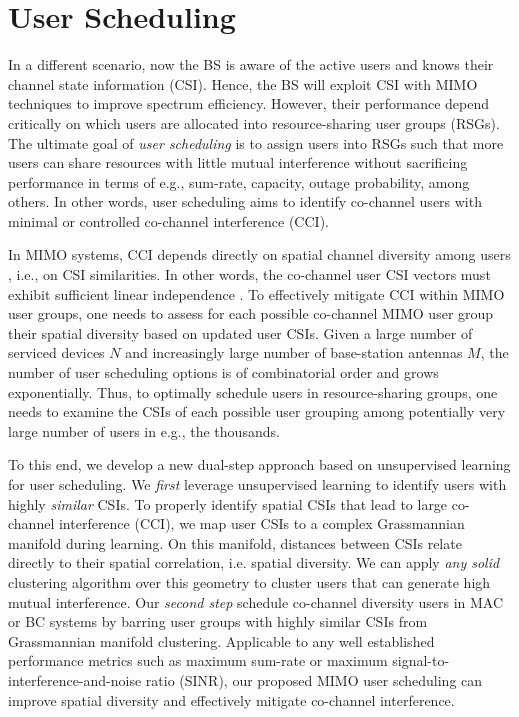\section{User Scheduling}

In a different scenario, now the BS is aware of the active users and knows their channel state information (CSI). Hence, the BS will exploit CSI with MIMO techniques to improve spectrum efficiency.
However, their performance depend critically on which users are allocated into resource-sharing user groups (RSGs). 
The ultimate goal of \emph{user scheduling} is to assign users into RSGs such that more users can share resources 
with little mutual interference
\cite{Goldsmith2003}
without sacrificing performance in terms of e.g., sum-rate, capacity, outage probability, among others.  
In other words, user scheduling aims to identify co-channel users with minimal or controlled co-channel interference (CCI). 

In MIMO systems, CCI depends directly on spatial channel diversity among users \cite{Eduardo17, Maciel10}, i.e., on CSI similarities. In other words, the co-channel user CSI vectors must exhibit sufficient linear independence \cite{Hong03, Shiu00}. 
To effectively mitigate CCI within MIMO user groups, one needs to assess for each possible co-channel MIMO user group their spatial diversity based on updated user CSIs. 
Given a large number of serviced devices $N$ and increasingly large number of base-station antennas $M$, the number of user scheduling options is of combinatorial order and grows exponentially. 
Thus, to optimally schedule users in resource-sharing groups, one needs to examine the CSIs of each possible user grouping among potentially very large number of users in e.g., the thousands. 


To this end, we develop a new dual-step approach based on unsupervised learning for user scheduling. We \emph{first} leverage unsupervised learning to identify users with highly \emph{similar} CSIs.  
To properly identify spatial CSIs that lead to large co-channel interference (CCI),  we map user CSIs to a %
complex Grassmannian manifold during learning. 
On this manifold, distances between CSIs relate directly to their spatial correlation, i.e. spatial diversity. 
We can apply \emph{any solid} clustering algorithm over this geometry to cluster users that can generate high mutual interference. 
Our \textit{second step} schedule co-channel diversity users in MAC or BC systems by barring user groups with highly similar CSIs from Grassmannian manifold clustering. 
Applicable to any well established performance metrics such as maximum sum-rate or maximum signal-to-interference-and-noise ratio (SINR), our proposed MIMO user scheduling can improve spatial diversity and effectively mitigate co-channel interference.









